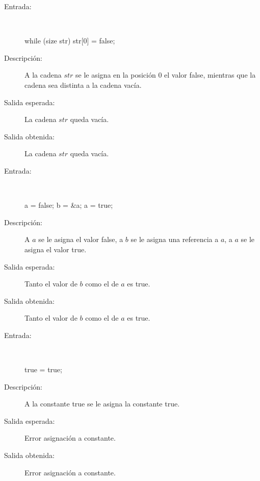 	\begin{description}
		\item [Entrada:] \hfill \\
\begin{myverbatim}
 while (size str) 
   str[0] = false;
\end{myverbatim}
		\item [Descripción:] A la cadena $str$ se le asigna en la posición 0 el valor false, mientras que la cadena sea distinta a la cadena vacía.
		\item [Salida esperada:] La cadena $str$ queda vacía.
		\item [Salida obtenida:] La cadena $str$ queda vacía.
	\end{description}

	\begin{description}
		\item [Entrada:] \hfill \\
\begin{myverbatim}
 a = false; 
 b = &a; 
 a = true; 
\end{myverbatim}
		\item [Descripción:] A $a$ se le asigna el valor false, a $b$ se le asigna una referencia a $a$, a $a$ se le asigna el valor true.
		\item [Salida esperada:] Tanto el valor de $b$ como el de $a$ es true.
		\item [Salida obtenida:] Tanto el valor de $b$ como el de $a$ es true.
	\end{description}

	\begin{description}
		\item [Entrada:] \hfill \\
\begin{myverbatim}
 true = true;
\end{myverbatim}
		\item [Descripción:] A la constante true se le asigna la constante true.
		\item [Salida esperada:] Error asignación a constante.
		\item [Salida obtenida:] Error asignación a constante.
	\end{description}

